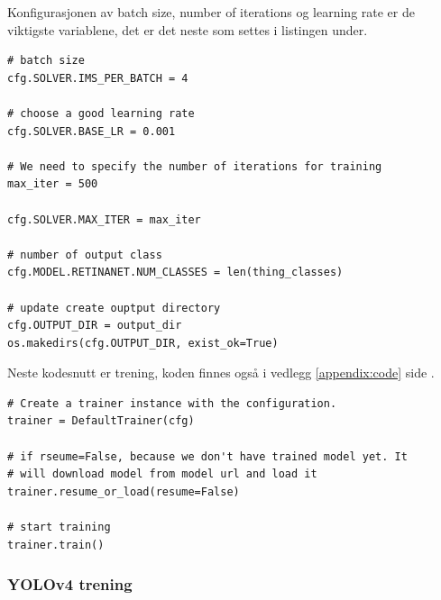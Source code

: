 Konfigurasjonen av batch size, number of iterations og learning rate er de viktigste variablene, det er det neste som settes i listingen under. 

\begin{tcolorbox}
\begin{verbatim}
# batch size
cfg.SOLVER.IMS_PER_BATCH = 4

# choose a good learning rate
cfg.SOLVER.BASE_LR = 0.001

# We need to specify the number of iterations for training
max_iter = 500

cfg.SOLVER.MAX_ITER = max_iter

# number of output class
cfg.MODEL.RETINANET.NUM_CLASSES = len(thing_classes)

# update create ouptput directory
cfg.OUTPUT_DIR = output_dir
os.makedirs(cfg.OUTPUT_DIR, exist_ok=True)
\end{verbatim}
\end{tcolorbox}

Neste kodesnutt er trening, koden finnes også i vedlegg \ref{appendix:code} side \pageref{lst:train}.

\begin{tcolorbox}
\begin{verbatim}
# Create a trainer instance with the configuration.
trainer = DefaultTrainer(cfg) 

# if rseume=False, because we don't have trained model yet. It
# will download model from model url and load it
trainer.resume_or_load(resume=False)

# start training
trainer.train()
\end{verbatim}
\end{tcolorbox}


\subsubsection{YOLOv4 trening}

